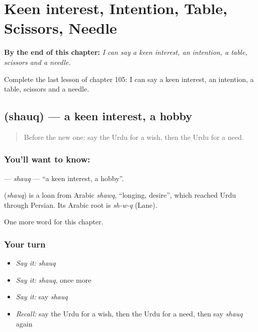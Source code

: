 
\chapter{Keen interest, Intention, Table, Scissors, Needle}
\label{ch:ur-keen-interest-intention-table-scissors-needle}

\begin{chapteropening}
\textbf{By the end of this chapter:} \emph{I can say a keen interest, an intention, a table, scissors and a needle.}

Complete the last lesson of chapter 105: I can say a keen interest, an intention, a table, scissors and a needle.
\end{chapteropening}

\section[\texorpdfstring{\ur{شوق} (shauq)}{شوق (shauq)}]{ (shauq) — a keen interest, a hobby}

\label{lesson:UR-C105-shauq}



\begin{quote}
Before the new one: say the Urdu for a wish, then the Urdu for a need.
\end{quote}

\subsection*{You'll want to know: }
\textbf{} — \emph{shauq} — \textquotedblleft{}a keen interest, a hobby\textquotedblright{}.

\begin{cousinweb}
\textbf{} (\emph{shauq}) is a loan from Arabic \emph{shawq}, \textquotedblleft{}longing, desire\textquotedblright{}, which reached Urdu through Persian. Its Arabic root is \emph{sh-w-q} (Lane).
\end{cousinweb}

\begin{grammarlens}[title={What you've built}]
One more word for this chapter.
\end{grammarlens}

\subsection*{Your turn}
\begin{itemize}
\raggedright
  \item \emph{Say it:} \emph{shauq}
  \item \emph{Say it:} \emph{shauq}, once more
  \item \emph{Say it:} say \emph{shauq}
  \item \emph{Recall:} say the Urdu for a wish, then the Urdu for a need, then say \emph{shauq} again
\end{itemize}

